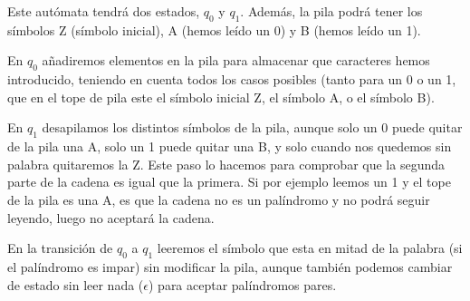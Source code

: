 \documentclass[12pt, spanish]{article}
\begin{document}
Este autómata tendrá dos estados, $q_0$ y $q_1$. Además, la pila podrá tener los símbolos Z (símbolo inicial), A (hemos leído un 0) y B (hemos leído un 1).

En $q_0$ añadiremos elementos en la pila para almacenar que caracteres hemos introducido, teniendo en cuenta todos los casos posibles (tanto para un 0 o un 1, que en el tope de pila este el símbolo inicial Z, el símbolo A, o el símbolo B).

En $q_1$ desapilamos los distintos símbolos de la pila, aunque solo un 0 puede quitar de la pila una A, solo un 1 puede quitar una B, y solo cuando nos quedemos sin palabra quitaremos la Z. Este paso lo hacemos para comprobar que la segunda parte de la cadena es igual que la primera. Si por ejemplo leemos un 1 y el tope de la pila es una A, es que la cadena no es un palíndromo y no podrá seguir leyendo, luego no aceptará la cadena.

En la transición de $q_0$ a $q_1$ leeremos el símbolo que esta en mitad de la palabra (si el palíndromo es impar) sin modificar la pila, aunque también podemos cambiar de estado sin leer nada ($\epsilon$) para aceptar palíndromos pares.
\end{document}
